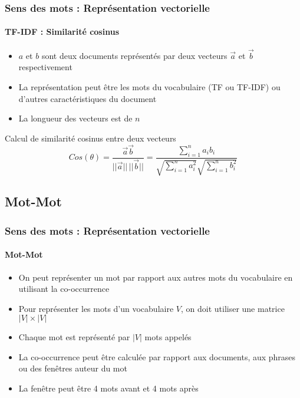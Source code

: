 \documentclass[xcolor=table]{beamer}
\begin{document}
\begin{frame}
\frametitle{Sens des mots : Représentation vectorielle}
\framesubtitle{TF-IDF : Similarité cosinus}

\begin{minipage}{.68\textwidth}
\begin{itemize}
	\item $a$ et $b$ sont deux documents représentés par deux vecteurs $\overrightarrow{a}$ et $\overrightarrow{b}$ respectivement
	\item La représentation peut être les mots du vocabulaire (TF ou TF-IDF) ou d'autres caractéristiques du document
	\item La longueur des vecteurs est de $n$
\end{itemize}
\end{minipage}
\begin{minipage}{.3\textwidth}
\end{minipage}

\begin{block}{Calcul de similarité cosinus entre deux vecteurs}
	\[
	Cos(\theta) = \frac{\overrightarrow{a} \overrightarrow{b}}{||\overrightarrow{a}||\, ||\overrightarrow{b}||}
	= \frac{\sum_{i=1}^{n} a_i b_i}{\sqrt{\sum_{i=1}^{n} a_i^2} \sqrt{\sum_{i=1}^{n} b_i^2}}
	\]
\end{block}

\end{frame}

\subsection{Mot-Mot}

\begin{frame}
\frametitle{Sens des mots : Représentation vectorielle}
\framesubtitle{Mot-Mot}

\begin{itemize}
	\item On peut représenter un mot par rapport aux autres mots du vocabulaire en utilisant la co-occurrence
	\item Pour représenter les mots d'un vocabulaire $ V $, on doit utiliser une matrice $|V| \times |V|$
	\item Chaque mot est représenté par $|V|$ mots appelés 
	\item La co-occurrence peut être calculée par rapport aux documents, aux phrases ou des fenêtres auteur du mot
	\item La fenêtre peut être 4 mots avant et 4 mots après
\end{itemize}

\end{frame}
\end{document}
